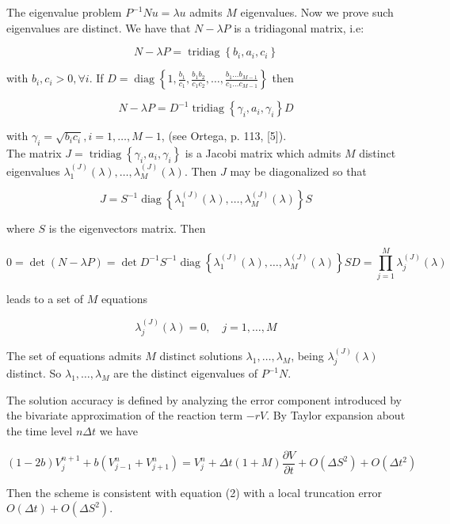 \documentclass[10pt]{article}
\begin{document}
The eigenvalue problem $P^{-1} N u=\lambda u$ admits $M$ eigenvalues. Now we prove such eigenvalues are distinct. We have that $N-\lambda P$ is a tridiagonal matrix, i.e:

$$
N-\lambda P=\operatorname{tridiag}\left\{b_{i}, a_{i}, c_{i}\right\}
$$

with $b_{i}, c_{i}>0, \forall i$. If $D=\operatorname{diag}\left\{1, \frac{b_{1}}{c_{1}}, \frac{b_{1} b_{2}}{c_{1} c_{2}}, \ldots, \frac{b_{1} \ldots b_{M-1}}{c_{1} \ldots c_{M-1}}\right\}$ then

$$
N-\lambda P=D^{-1} \operatorname{tridiag}\left\{\gamma_{i}, a_{i}, \gamma_{i}\right\} D
$$

with $\gamma_{i}=\sqrt{b_{i} c_{i}}, i=1, \ldots, M-1$, (see Ortega, p. 113, [5]).\\
The matrix $J=\operatorname{tridiag}\left\{\gamma_{i}, a_{i}, \gamma_{i}\right\}$ is a Jacobi matrix which admits $M$ distinct eigenvalues $\lambda_{1}^{(J)}(\lambda), \ldots, \lambda_{M}^{(J)}(\lambda)$. Then $J$ may be diagonalized so that

$$
J=S^{-1} \operatorname{diag}\left\{\lambda_{1}^{(J)}(\lambda), \ldots, \lambda_{M}^{(J)}(\lambda)\right\} S
$$

where $S$ is the eigenvectors matrix. Then

$$
0=\operatorname{det}(N-\lambda P)=\operatorname{det} D^{-1} S^{-1} \operatorname{diag}\left\{\lambda_{1}^{(J)}(\lambda), \ldots, \lambda_{M}^{(J)}(\lambda)\right\} S D=\prod_{j=1}^{M} \lambda_{j}^{(J)}(\lambda)
$$

leads to a set of $M$ equations

$$
\lambda_{j}^{(J)}(\lambda)=0, \quad j=1, \ldots, M
$$

The set of equations admits $M$ distinct solutions $\lambda_{1}, \ldots, \lambda_{M}$, being $\lambda_{j}^{(J)}(\lambda)$ distinct. So $\lambda_{1}, \ldots, \lambda_{M}$ are the distinct eigenvalues of $P^{-1} N$.

The solution accuracy is defined by analyzing the error component introduced by the bivariate approximation of the reaction term $-r V$. By Taylor expansion about the time level $n \Delta t$ we have

$$
(1-2 b) V_{j}^{n+1}+b\left(V_{j-1}^{n}+V_{j+1}^{n}\right)=V_{j}^{n}+\Delta t(1+M) \frac{\partial V}{\partial t}+O\left(\Delta S^{2}\right)+O\left(\Delta t^{2}\right)
$$

Then the scheme is consistent with equation (2) with a local truncation error $O(\Delta t)+O\left(\Delta S^{2}\right)$.
\end{document}
